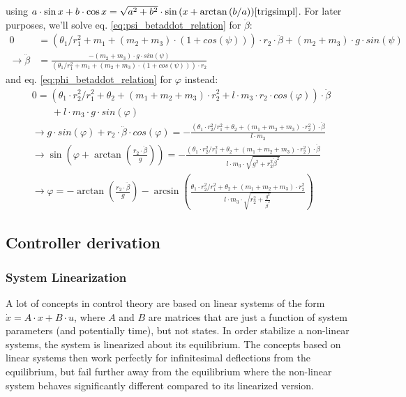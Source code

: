\documentclass{article}
\begin{document}
using $a \cdot \sin{x} + b \cdot \cos {x} = \sqrt{a^2+b^2} \cdot \sin{\left(x+\arctan{\left(b/a\right)} \right)} \cite{trigsimpl}$.
For later purposes, we'll solve eq. \ref{eq:psi_betaddot_relation} for $\ddot{\beta}$:
\begin{align}
0 &= (\theta_1/r_1^2  + m_1 + (m_2+m_3) \cdot (1+cos(\psi))) \cdot r_2 \cdot \ddot{\beta} + (m_2+m_3) \cdot g \cdot sin(\psi) \nonumber \\
\rightarrow \ddot{\beta} &= \frac{-(m_2+m_3) \cdot g \cdot sin(\psi) }{(\theta_1/r_1^2  + m_1 + (m_2+m_3) \cdot (1+cos(\psi))) \cdot r_2}
\label{eq:beta_ddot_vs_psi}
\end{align}
and eq. \ref{eq:phi_betaddot_relation} for $\varphi$ instead:
\begin{align}
0 = \left(\theta_1 \cdot r_2^2/r_1^2 + \theta_2 + (m_1 + m_2 + m_3) \cdot r_2^2 + l \cdot m_3 \cdot r_2 \cdot cos(\varphi) \right) \cdot \ddot{\beta}  \nonumber \\
\qquad  + l \cdot m_3 \cdot g \cdot sin(\varphi) \nonumber \\
\rightarrow  g \cdot sin(\varphi) + r_2 \cdot \ddot{\beta} \cdot cos(\varphi) = -\frac{\left(\theta_1 \cdot r_2^2/r_1^2 + \theta_2 + (m_1 + m_2 + m_3) \cdot r_2^2 \right) \cdot \ddot{\beta} }{l \cdot m_3} \nonumber \\
\rightarrow \sin{\left( \varphi + \arctan{\left( \frac{r_2 \cdot \ddot{\beta}}{g}\right)} \right)} = -\frac{\left(\theta_1 \cdot r_2^2/r_1^2 + \theta_2 + (m_1 + m_2 + m_3) \cdot r_2^2 \right) \cdot \ddot{\beta} }{l \cdot m_3 \cdot \sqrt{g^2 + r_2^2 \ddot{\beta}^2}} \nonumber \\
\rightarrow \varphi = -\arctan{\left( \frac{r_2 \cdot \ddot{\beta}}{g}\right)} - \arcsin{\left( \frac{\theta_1 \cdot r_2^2/r_1^2 + \theta_2 + (m_1 + m_2 + m_3) \cdot r_2^2 }{l \cdot m_3 \cdot \sqrt{r_2^2 + \frac{g^2}{\ddot{\beta}^2}}} \right)}
\label{eq:phi_vs_beta_ddot}
\end{align}

\subsection{Controller derivation}

\subsubsection{System Linearization}
\label{ss:syslin}
A lot of concepts in control theory are based on linear systems of the form $\dot{x} = A \cdot x + B \cdot u$, where $A$ and $B$ are matrices that are just a function of system parameters (and potentially time), but not states.
In order stabilize a non-linear systems, the system is linearized about its equilibrium.
The concepts based on linear systems then work perfectly for infinitesimal deflections from the equilibrium, but fail further away from the equilibrium where the non-linear system behaves significantly different compared to its linearized version.
\end{document}
